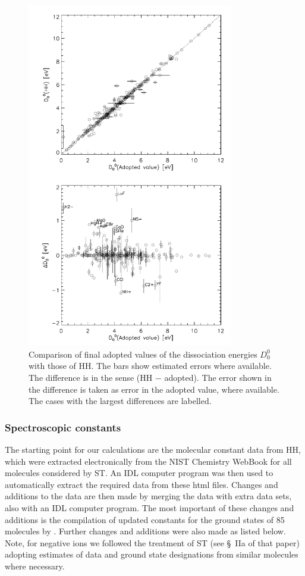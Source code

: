 \documentclass[traditabstract]{aa} %
\begin{document}
  \begin{figure}
   \centering
   \includegraphics[width=90mm,angle=0]{figures/diss2.pdf}
      \caption{Comparison of final adopted values of the dissociation energies $D_0^0$ with those of HH.  The bars show estimated errors where available.  The difference is in the sense (HH $-$ adopted).  The error shown in the difference is taken as error in the adopted value, where available.  The cases with the largest differences are labelled.
              }
         \label{fig:diss2}
   \end{figure}

\subsubsection{Spectroscopic constants}
\label{sect:specconsts}

The starting point for our calculations are the molecular constant data from HH, which were extracted electronically from the NIST Chemistry WebBook \cite[][retrieved October 14, 2011]{HHb} for all molecules considered by ST.  An IDL computer program was then used to automatically extract the required data from these html files.   Changes and additions to the data are then made by merging the data with extra data sets, also with an IDL computer program.  The most important of these changes and additions is the compilation of updated constants for the ground states of 85 molecules by \cite{2007JPCRD..36..389I, 2009JPCRD..38..749I}.  Further changes and additions were also made as listed below.  Note, for negative ions we followed the treatment of ST (see \S~IIa of that paper) adopting estimates of data and ground state designations from similar molecules where necessary.
\end{document}
